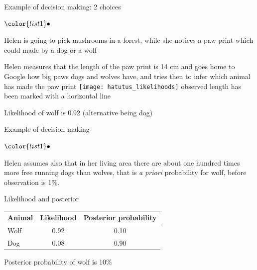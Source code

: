 \documentclass[t]{beamer}
\newenvironment{list1}{
   \begin{list}{$\color{list1}\bullet$}{\itemsep=6pt}}{
  \end{list}}
\begin{document}
\begin{frame}

{\Large\color{navyblue} Example of decision making: 2 choices}
\vspace{-0.5\baselineskip}
\begin{list1}
\item<+-> Helen is going to pick mushrooms in a forest, while she notices a
  paw print which could made by a dog or a wolf
\item<+-> Helen measures that the length of the paw print is 14 cm and
  goes home to Google how big paws dogs and wolves have, and tries
  then to infer which animal has made the paw print
  \texttt{[image: hatutus\_likelihoods]}
  observed length has been marked with a horizontal line
\item<+-> Likelihood of wolf is 0.92 (alternative being dog)
\end{list1}

\end{frame}

\begin{frame}
  
{\Large\color{navyblue} Example of decision making}

  \begin{list1}
  \item<+-> Helen assumes also that in her living area there are about one
    hundred times more free running dogs than wolves, that is {\em a
      priori} probability for wolf, before observation is 1\%.
  \item<+-> Likelihood and posterior
    \begin{center}\leavevmode
      \begin{tabular}{| l | c c |}
        \hline
        Animal &  Likelihood & Posterior probability \\
        \hline
        Wolf     &  0.92            & 0.10      \\
        Dog    &  0.08        & 0.90    \\
        \hline
      \end{tabular}
    \end{center}
  \item<+-> Posterior probability of wolf is 10\%
  \end{list1}

\end{frame}
\end{document}

